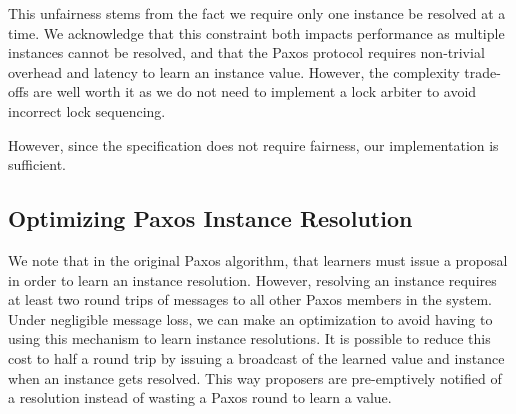 \documentclass{article}
\begin{document}
This unfairness stems from the fact we require only one instance be resolved at a time. We acknowledge that this constraint both impacts performance as multiple instances cannot be resolved, and that the Paxos protocol requires non-trivial overhead and latency to learn an instance value. However, the complexity trade-offs are well worth it as we do not need to implement a lock arbiter to avoid incorrect lock sequencing.

However, since the specification does not require fairness, our implementation is sufficient.

\subsection{Optimizing Paxos Instance Resolution}

We note that in the original Paxos algorithm, that learners must issue a proposal in order to learn an instance resolution.
However, resolving an instance requires at least two round trips of messages to all other Paxos members in the system.
Under negligible message loss, we can make an optimization to avoid having to using this mechanism to learn instance resolutions.
It is possible to reduce this cost to half a round trip by issuing a broadcast of the learned value and instance when an instance gets resolved.
This way proposers are pre-emptively notified of a resolution instead of wasting a Paxos round to learn a value.
\end{document}

